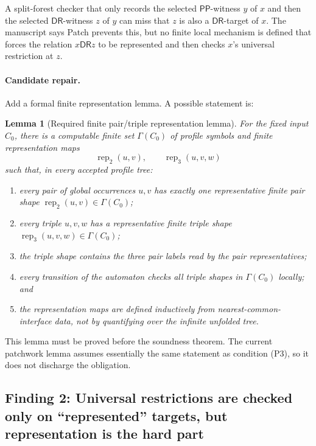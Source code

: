 \documentclass[11pt]{article}
\newcommand{\PP}{\mathsf{PP}}
\newcommand{\DR}{\mathsf{DR}}
\newtheorem{lemma}{Lemma}
\begin{document}
A split-forest checker that only records the selected $\PP$-witness $y$ of $x$ and then the selected $\DR$-witness $z$ of $y$ can miss that $z$ is also a $\DR$-target of $x$.  The manuscript says \textsf{Patch} prevents this, but no finite local mechanism is defined that forces the relation $x\DR z$ to be represented and then checks $x$'s universal restriction at $z$.

\paragraph{Candidate repair.}
Add a formal finite representation lemma.  A possible statement is:

\begin{lemma}[Required finite pair/triple representation lemma]
For the fixed input $C_0$, there is a computable finite set $\Gamma(C_0)$ of profile symbols and finite representation maps
\[
  \operatorname{rep}_2(u,v),\qquad \operatorname{rep}_3(u,v,w)
\]
such that, in every accepted profile tree:
\begin{enumerate}[label=(R\arabic*)]
\item every pair of global occurrences $u,v$ has exactly one representative finite pair shape $\operatorname{rep}_2(u,v)\in\Gamma(C_0)$;
\item every triple $u,v,w$ has a representative finite triple shape $\operatorname{rep}_3(u,v,w)\in\Gamma(C_0)$;
\item the triple shape contains the three pair labels read by the pair representatives;
\item every transition of the automaton checks all triple shapes in $\Gamma(C_0)$ locally; and
\item the representation maps are defined inductively from nearest-common-interface data, not by quantifying over the infinite unfolded tree.
\end{enumerate}
\end{lemma}

This lemma must be proved before the soundness theorem.  The current patchwork lemma assumes essentially the same statement as condition (P3), so it does not discharge the obligation.

\subsection{Finding 2: Universal restrictions are checked only on ``represented'' targets, but representation is the hard part}
\end{document}
